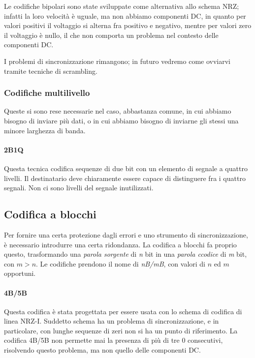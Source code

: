             Le codifiche bipolari sono state sviluppate come alternativa allo schema NRZ; infatti la loro velocità è uguale, ma non abbiamo componenti DC, in quanto per valori positivi il voltaggio si alterna fra positivo e negativo, mentre per valori zero il voltaggio è nullo, il che non comporta un problema nel contesto delle componenti DC.
            
            I problemi di sincronizzazione rimangono; in futuro vedremo come ovviarvi tramite tecniche di scrambling.
            
        \subsubsection{Codifiche multilivello}
            Queste si sono rese necessarie nel caso, abbastanza comune, in cui abbiamo bisogno di inviare più dati, o in cui abbiamo bisogno di inviarne gli stessi una minore larghezza di banda.
            
            \paragraph{2B1Q} Questa tecnica codifica sequenze di due bit con un elemento di segnale a quattro livelli. Il destinatario deve chiaramente essere capace di distinguere fra i quattro segnali. Non ci sono livelli del segnale inutilizzati.
            
    \subsection{Codifica a blocchi}
        Per fornire una certa protezione dagli errori e uno strumento di sincronizzazione, è necessario introdurre una certa ridondanza. La codifica a blocchi fa proprio questo, trasformando una \textit{parola sorgente} di \textit{n} bit in una \textit{parola ccodice} di \textit{m} bit, con $m > n$. Le codifiche prendono il nome di \textit{nB/mB}, con valori di $n$ ed $m$ opportuni.
        
        \paragraph{4B/5B} Questa codifica è stata progettata per essere usata con lo schema di codifica di linea NRZ-I. Suddetto schema ha un problema di sincronizzazione, e in particolare, con lunghe sequenze di zeri non si ha un punto di riferimento. La codifica 4B/5B non permette mai la presenza di più di tre 0 consecutivi, risolvendo questo problema, ma non quello delle componenti DC.
    
